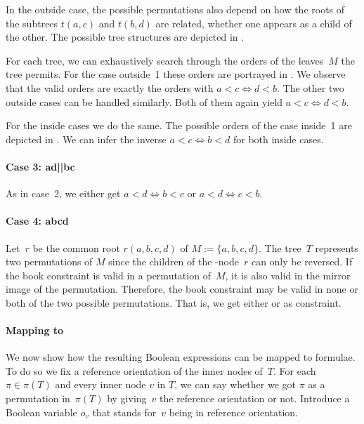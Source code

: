 In the outside case, the
possible permutations also depend on how the roots of the subtrees $t(a, c)$ and $t(b, d)$ are related,
\ie whether one appears as a child of the other. The possible tree structures are depicted
in .  

For each tree, we can exhaustively search through the orders of the leaves~$M$ the tree permits. For the 
case outside~1 these orders are portrayed in . We observe that the
valid orders are exactly the orders with $a < c \Leftrightarrow d < b$. The other two outside
cases can be handled similarly. Both of them again yield $a < c \Leftrightarrow d < b$.

For the inside cases we do the same. The possible orders of the case inside~1 are depicted in . We can infer the
inverse $a < c \Leftrightarrow b < d$ for both inside cases. 

\paragraph{Case 3: ad||bc}

As in case~2, we either get $a < d \Leftrightarrow b < c$ or
$a < d \Leftrightarrow c < b$.

\paragraph{Case 4: abcd}

Let~$r$ be the common root $r(a, b, c, d)$ of $M := \{a, b, c, d\}$. The tree~$T$
represents two permutations of $M$ since the children of the \Q-node~$r$ can
only be reversed. If the book constraint is valid in a permutation of~$M$, it is also valid in the
mirror image of the permutation. Therefore, the book constraint may be valid in none or both of the two possible permutations. That is, we get either  or
 as constraint.

\paragraph{Mapping \probBook to \probTwoSat}

We now show how the resulting Boolean expressions can be mapped to \probTwoSat formulae.
To do so we fix a reference orientation of the inner nodes of~$T$.
For each $\pi \in \pi(T)$ and every inner node $v$ in $T$, we can say whether
we got $\pi$ as a permutation in~$\pi(T)$ by giving~$v$ the reference orientation or not.
Introduce a Boolean variable $o_v$ that stands for~$v$ being in reference orientation.

